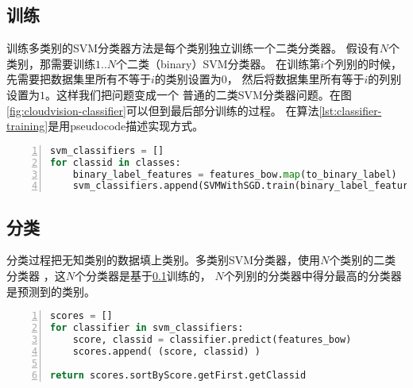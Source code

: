 \subsection{训练}
\label{subsec:classifier-training}
训练多类别的SVM分类器方法是每个类别独立训练一个二类分类器。
假设有$N$个类别，那需要训练$1..N$个二类（binary）SVM分类器。
在训练第$i$个列别的时候，先需要把数据集里所有不等于$i$的类别设置为$0$，
然后将数据集里所有等于$i$的列别设置为$1$。这样我们把问题变成一个
普通的二类SVM分类器问题。在图\ref{fig:cloudvision-classifier}可以但到最后部分训练的过程。
在算法\ref{lst:classifier-training}是用pseudocode描述实现方式。
\begin{lstlisting}[language=Python,
                   basicstyle=\small,
                   numbers=left,
                   showstringspaces=false,
                   caption={SVM多类别分类器训练pseudocode},
                   label={lst:classifier-training}]
svm_classifiers = []
for classid in classes:
    binary_label_features = features_bow.map(to_binary_label)
    svm_classifiers.append(SVMWithSGD.train(binary_label_features))
\end{lstlisting}



\subsection{分类}
\label{subsec:classifier-label}
分类过程把无知类别的数据填上类别。多类别SVM分类器，使用$N$个类别的二类分类器
，这$N$个分类器是基于\ref{subsec:classifier-training}训练的，
$N$个列别的分类器中得分最高的分类器是预测到的类别。
\begin{lstlisting}[language=Python,
                   basicstyle=\small,
                   numbers=left,
                   showstringspaces=false,
                   caption={SVM多类别分类器分类pseudocode},
                   label={lst:classifier-training}]
scores = []
for classifier in svm_classifiers:
    score, classid = classifier.predict(features_bow)
    scores.append( (score, classid) )

return scores.sortByScore.getFirst.getClassid
\end{lstlisting}





